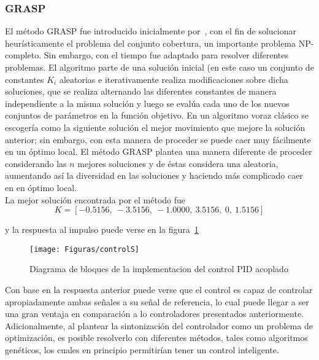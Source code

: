 \subsubsection{GRASP}
El método GRASP fue introducido inicialmente por~\citet{Feo1989}, con el fin de solucionar
heurísticamente el problema del conjunto cobertura, un importante problema NP-completo.
Sin embargo, con el tiempo fue adaptado para resolver diferentes problemas.
El algoritmo parte de una solución inicial (en este caso un conjunto de constantes $K_i$
aleatorias e iterativamente realiza modificaciones sobre dicha soluciones, que se realiza
alternando las diferentes constantes de manera independiente a la misma solución y luego se
evalúa cada uno de los nuevos conjuntos de parámetros en la función objetivo. En un algoritmo
voraz clásico se escogería como la siguiente solución el mejor movimiento que mejore la solución
anterior; sin embargo, con esta manera de proceder se puede caer muy fácilmente en un óptimo local. El método
GRASP plantea una manera diferente de proceder considerando las $n$ mejores soluciones y de éstas
considera una aleatoria, aumentando así la diversidad en las soluciones y haciendo más complicado caer en
en óptimo local.\\

La mejor solución encontrada por el método fue
\[K = [-0.5156,\   -3.5156,\   -1.0000,\    3.5156,\         0,\    1.5156]\]

y la respuesta al impulso puede verse en la figura~\ref{fig:controlS}
\begin{figure}[t]
  \label{fig:controlS}
  \texttt{[image: Figuras/controlS]}
  \caption{Diagrama de bloques de la implementacion del control PID acoplado} 
\end{figure}

Con base en la respuesta anterior puede verse que el control es capaz de controlar apropiadamente ambas
señales a su señal de referencia, lo cual puede llegar a ser una gran ventaja en comparación
a lo controladores presentados anteriormente. Adicionalmente, al plantear la sintonización del
controlador como un problema de optimización, es posible resolverlo con diferentes métodos, tales
como algoritmos genéticos, los cuales en principio permitirían tener un control inteligente.
